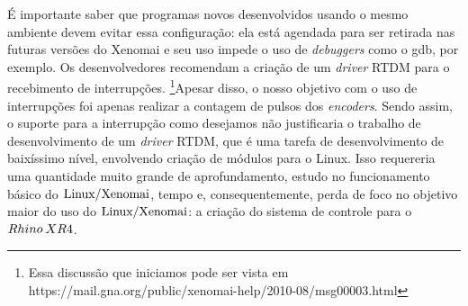 É importante saber que programas novos desenvolvidos usando o mesmo
ambiente devem evitar essa configuração: ela está agendada para ser
retirada nas futuras versões do Xenomai e seu uso impede o uso de
\textit{debuggers} como o gdb, por exemplo. Os desenvolvedores recomendam
a criação de um \textit{driver} RTDM para o recebimento de interrupções.%
\footnote{Essa discussão que iniciamos pode ser vista em https://mail.gna.org/public/xenomai-help/2010-08/msg00003.html%
}Apesar disso, o nosso objetivo com o uso de interrupções foi apenas
realizar a contagem de pulsos dos \textit{encoders}. Sendo assim,
o suporte para a interrupção como desejamos não justificaria o trabalho
de desenvolvimento de um \textit{driver} RTDM, que é uma tarefa de
desenvolvimento de baixíssimo nível, envolvendo criação de módulos
para o Linux. Isso requereria uma quantidade muito grande de aprofundamento,
estudo no funcionamento básico do $\text{Linux/Xenomai}$, tempo e, consequentemente,
perda de foco no objetivo maior do uso do $\text{Linux/Xenomai}$: a criação
do sistema de controle para o $Rhino\: XR4$.
